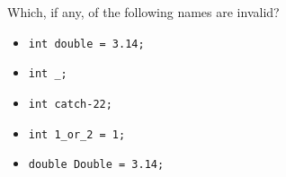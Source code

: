 %
%
\begin{question}
Which, if any, of the following names are invalid?
\begin{itemize}
^^I\item \verb|int double = 3.14;|
^^I\item \verb|int _;|
^^I\item \verb|int catch-22;|
^^I\item \verb|int 1_or_2 = 1;|
^^I\item \verb|double Double = 3.14;|
\end{itemize}
\end{question}
